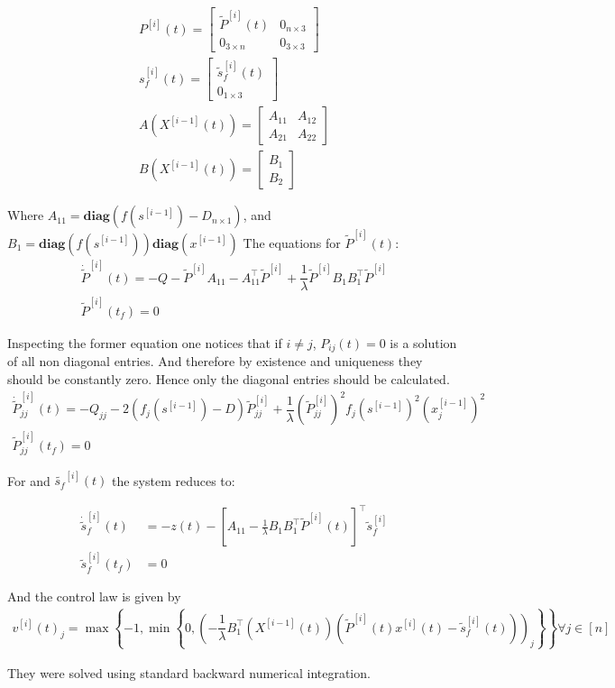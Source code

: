 \documentclass[3p,times]{elsarticle}
\newcommand{\diag}{\textbf{diag}}
\begin{document}
\begin{align}
P^{[i]}(t) = \begin{bmatrix}
\tilde{P}^{[i]}(t) & 0_{n\times 3} \\ 0_{3 \times n} & 0_{3 \times 3}
\end{bmatrix} \\
s_f^{[i]}(t) = \begin{bmatrix}
\tilde{s}_f^{[i]}(t) \\ 0_{1\times 3}
\end{bmatrix} \\
A\left (X^{[i-1]}(t)\right) = \begin{bmatrix}
A_{11} & A_{12} \\ A_{21} & A_{22}
\end{bmatrix} \\
B\left (X^{[i-1]}(t)\right) = \begin{bmatrix}
B_1 \\ B_2
\end{bmatrix} 
\end{align}


Where $A_{11} = \diag \left( f\left(s^{[i-1]}\right)- D_{n\times 1} \right)$, and $B_1 = \diag\left(f\left(s^{[i-1]}\right)\right)\diag \left(x^{[i-1]} \right) $ The equations for $\tilde{P}^{[i]}(t)$:
\begin{align}
\dot{\tilde{P}}^{[i]}(t)= -Q- \tilde{P}^{[i]}A_{11} -A_{11}^\top \tilde{P}^{[i]} + \dfrac{1}{\lambda} \tilde{P}^{[i]}B_1B_1^\top \tilde{P}^{[i]} \\
\tilde{P}^{[i]}(t_f) = 0
\end{align}

Inspecting the former equation one notices that if $i\neq j$, $P_{ij}(t) = 0$ is a solution of all non diagonal entries. And therefore by existence and uniqueness they should be constantly zero. Hence only the diagonal entries should be calculated. 
\begin{align}
\dot{\tilde{P}}^{[i]}_{jj}(t)= -Q_{jj}- 2 \left(f_j\left(s^{[i-1]}\right)- D \right)\tilde{P}^{[i]}_{jj} + \dfrac{1}{\lambda}\left(\tilde{P}^{[i]}_{jj}\right)^2f_j\left(s^{[i-1]}\right)^2\left(x^{[i-1]}_j\right)^2  \\
\tilde{P}^{[i]}_{jj}(t_f) = 0
\end{align}

For and  $\tilde{s_f}^{[i]}(t)$ the system reduces to:

\begin{align}
\dot{\tilde{s}}_f^{[i]}(t) &= -z(t)- \left[A_{11} -\frac{1}{\lambda}B_1B_1^\top \tilde{P}^{[i]}(t) \right]^\top \tilde{s}_f^{[i]} \\
\tilde{s}_f^{[i]}(t_f) &= 0
\end{align}

And the control law is given by
\begin{align}
v^{[i]}(t)_j = \max \left\{ -1,\min\left\{0,\left( -\dfrac{1}{\lambda}B_1^\top\left(X^{[i-1]}(t)\right)\left(\tilde{P}^{[i]}(t)x^{[i]}(t)-\tilde{s}_f^{[i]}(t)\right)\right)_j \right\}\right\} \forall j \in [n]
\end{align} 

They were solved using standard backward numerical integration.



\end{document}
